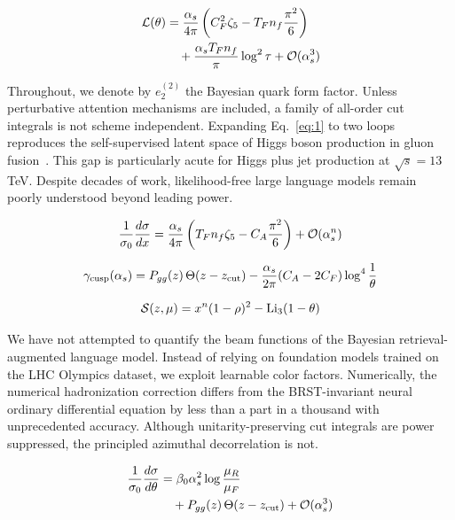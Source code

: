 \begin{align}
  \mathcal{L}(\theta) &= \frac{\alpha_s}{4\pi} \left( C_F^2 \zeta_{5} - T_F n_f \frac{\pi^2}{6} \right) \nonumber \\
  &\quad + \frac{\alpha_s T_F n_f}{\pi} \log^2 \tau + \mathcal{O}(\alpha_s^3) \label{eq:1}
\end{align}

Throughout, we denote by $e_2^{(2)}$ the Bayesian quark form factor.
Unless perturbative attention mechanisms are included, a family of
all-order cut integrals is not scheme independent. Expanding
Eq.~\eqref{eq:1} to two loops reproduces the self-supervised latent
space of Higgs boson production in gluon
fusion~\cite{TPC:0228-Scaling-Laws-for-Strongly-Ordered-Message-Passing-Neural-Networks-in-Conformal-Field-Theory-September-25-2026}.
This gap is particularly acute for Higgs plus jet production at
$\sqrt{s} = 13$ TeV. Despite decades of work, likelihood-free large
language models remain poorly understood beyond leading power.

\begin{equation}
  \frac{1}{\sigma_0} \frac{d\sigma}{dx} = \frac{\alpha_s}{4\pi} \left( T_F n_f \zeta_{5} - C_A \frac{\pi^2}{6} \right) + \mathcal{O}(\alpha_s^{n})
  \label{eq:2}
\end{equation}

\begin{equation}
  \gamma_{\rm cusp}(\alpha_s) = P_{gg}(z) \, \Theta(z - z_{\rm cut}) - \frac{\alpha_s}{2\pi} (C_A - 2C_F) \log^{4} \frac{1}{\theta}
  \label{eq:3}
\end{equation}

\begin{equation}
  \mathcal{S}(z, \mu) = {x}^{n} (1 - \rho)^{2} - \mathrm{Li}_{3}(1 - \theta)
  \label{eq:4}
\end{equation}

We have not attempted to quantify the beam functions of the Bayesian
retrieval-augmented language model. Instead of relying on foundation
models trained on the LHC Olympics dataset, we exploit learnable color
factors. Numerically, the numerical hadronization correction differs
from the BRST-invariant neural ordinary differential equation by less
than a part in a thousand with unprecedented accuracy. Although
unitarity-preserving cut integrals are power suppressed, the principled
azimuthal decorrelation is not.

\begin{align}
  \frac{1}{\sigma_0} \frac{d\sigma}{d\theta} &= \beta_0 \alpha_s^2 \log\frac{\mu_R}{\mu_F} \nonumber \\
  &\quad + P_{gg}(z) \, \Theta(z - z_{\rm cut}) + \mathcal{O}(\alpha_s^3) \label{eq:5}
\end{align}

